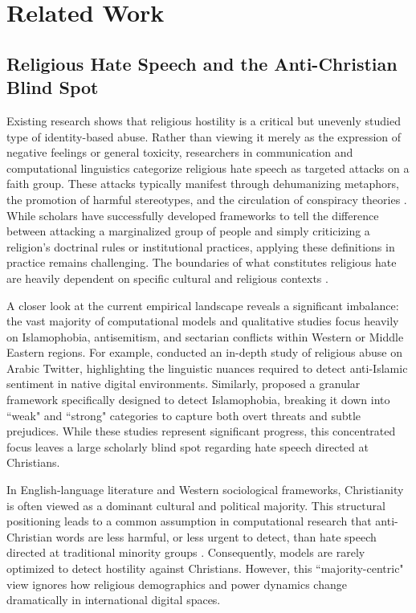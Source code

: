 \documentclass[../CLthesis.tex]{subfiles}
\begin{document}
\chapter{Related Work}%
\label{chap:related-work}

\section{Religious Hate Speech and the Anti-Christian Blind Spot}

Existing research shows that religious hostility is a critical but unevenly studied type of identity-based abuse. Rather than viewing it merely as the expression of negative feelings or general toxicity, researchers in communication and computational linguistics categorize religious hate speech as targeted attacks on a faith group. These attacks typically manifest through dehumanizing metaphors, the promotion of harmful stereotypes, and the circulation of conspiracy theories \citep{paz_hate_2020, castano-pulgarin_internet_2021}. While scholars have successfully developed frameworks to tell the difference between attacking a marginalized group of people and simply criticizing a religion's doctrinal rules or institutional practices, applying these definitions in practice remains challenging. The boundaries of what constitutes religious hate are heavily dependent on specific cultural and religious contexts \citep{bilewicz_hate_2020, thomson_identity-based_2021}.

A closer look at the current empirical landscape reveals a significant imbalance: the vast majority of computational models and qualitative studies focus heavily on Islamophobia, antisemitism, and sectarian conflicts within Western or Middle Eastern regions. For example, \citet{albadi_are_2018} conducted an in-depth study of religious abuse on Arabic Twitter, highlighting the linguistic nuances required to detect anti-Islamic sentiment in native digital environments. Similarly, \citet{vidgen_detecting_2020} proposed a granular framework specifically designed to detect Islamophobia, breaking it down into ``weak" and ``strong" categories to capture both overt threats and subtle prejudices. While these studies represent significant progress, this concentrated focus leaves a large scholarly blind spot regarding hate speech directed at Christians. 

In English-language literature and Western sociological frameworks, Christianity is often viewed as a dominant cultural and political majority. This structural positioning leads to a common assumption in computational research that anti-Christian words are less harmful, or less urgent to detect, than hate speech directed at traditional minority groups \citep{Yancey2014, scheitle2020}. Consequently, models are rarely optimized to detect hostility against Christians. However, this ``majority-centric" view ignores how religious demographics and power dynamics change dramatically in international digital spaces. 
\end{document}

